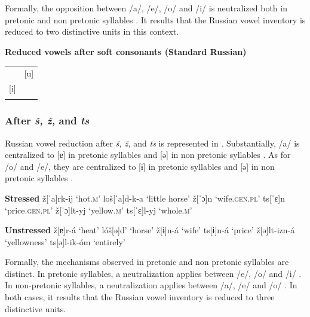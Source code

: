 \documentclass[output=paper,
modfonts,
newtxmath,
hidelinks,
]{langscibook}
\begin{document}
\noindent Formally, the opposition between /a/, /e/, /o/ and /i/ is neutralized both in pretonic and non pretonic syllables . It results that the Russian vowel inventory is reduced to two distinctive units in this context.

\ea \textbf{Reduced vowels after soft consonants (Standard Russian)}\label{6}\\\medskip
\begin{tabular}{|p{1.7cm}p{1.7cm}|}
\hline
&\multicolumn{1}{|c|}{[u]}\\\cline{2-2}
\multicolumn{1}{|c}{[i]}&\\
&\\\hline
\end{tabular}
\z

\subsubsection{After \textit{š, ž,} and \textit{ts}}\label{s2.1.3}

Russian vowel reduction after \textit{š, ž,} and \textit{ts} is represented in . Substantially, /a/ is centralized to [ɐ] in pretonic syllables  and [ə] in non pretonic syllables . As for /o/ and /e/, they are centralized to [ɨ] in pretonic syllables  and [ə] in non pretonic syllables .%

\newpage
\ea\label{7}\begin{multicols}{2}
\begin{xlist}
\exi{} \textbf{Stressed}
\ex ž[ˈa]rk-ij \tabto{2.1cm}‘hot.\textsc{m}’\label{7a}
\ex loš[ˈa]d-k-a \tabto{2.1cm}‘little horse’\label{7b}
\ex ž[ˈɔ]n \tabto{2.1cm}‘wife.\textsc{gen.pl}’\label{7c}
\exi{} ts[ˈɛ]n \tabto{2.1cm}‘price.\textsc{gen.pl}’
\ex ž[ˈɔ]lt-yj \tabto{2.1cm}‘yellow.\textsc{m}’\label{7d}
\exi{} ts[ˈɛ]l-yj \tabto{2.1cm}‘whole.\textsc{m}’
\end{xlist}\columnbreak
\begin{xlist}
\exi{} \textbf{Unstressed}
\exi{} ž[ɐ]r-á \tabto{2.1cm}‘heat’
\exi{} lóš[ə]d’ \tabto{2.1cm}‘horse’
\exi{} ž[ɨ]n-á \tabto{2.1cm}‘wife’
\exi{} ts[ɨ]n-á \tabto{2.1cm}‘price’
\exi{} ž[ə]lt-izn-á \tabto{2.1cm}‘yellowness’
\exi{} ts[ə]l-ik-óm \tabto{2.1cm}‘entirely’
\end{xlist}
\end{multicols}
\z

\noindent Formally, the mechanisms observed in pretonic and non pretonic syllables are distinct. In pretonic syllables, a neutralization applies between /e/, /o/ and /i/ . In non-pretonic syllables, a neutralization applies between /a/, /e/ and /o/ . In both cases, it results that the Russian vowel inventory is reduced to three distinctive units.
\end{document}
